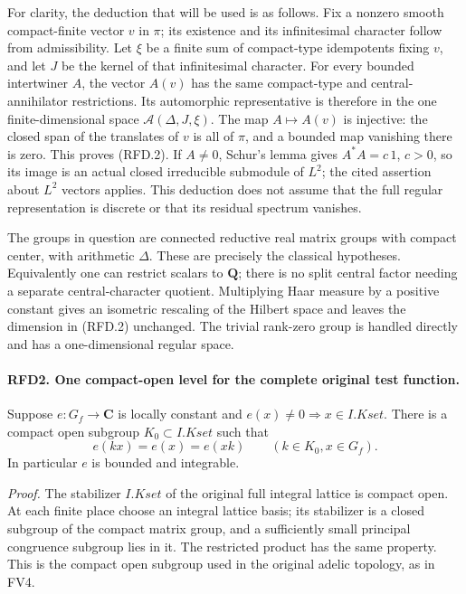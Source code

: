 For clarity, the deduction that will be used is as follows.  Fix a
nonzero smooth compact-finite vector \(v\) in \(\pi\); its existence
and its infinitesimal character follow from admissibility.  Let
\(\xi\) be a finite sum of compact-type idempotents fixing \(v\),
and let \(J\) be the kernel of that infinitesimal character.
For every bounded intertwiner \(A\), the vector \(A(v)\) has the
same compact-type and central-annihilator restrictions.  Its
automorphic representative is therefore in the one finite-dimensional
space \(\mathcal A(\Delta,J,\xi)\).  The map \(A\mapsto A(v)\)
is injective: the closed span of the translates of \(v\) is all of
\(\pi\), and a bounded map vanishing there is zero.  This proves
(RFD.2).  If \(A\ne0\), Schur's lemma gives \(A^*A=c\,1\),
\(c>0\), so its image is an actual closed irreducible submodule of
\(L^2\); the cited assertion about \(L^2\) vectors applies.
This deduction does not assume that the full regular representation
is discrete or that its residual spectrum vanishes.

The groups in question are connected reductive real matrix groups
with compact center, with arithmetic \(\Delta\).  These are precisely
the classical hypotheses.  Equivalently one can restrict scalars to
\(\mathbf Q\); there is no split central factor needing a separate
central-character quotient.  Multiplying Haar measure by a positive
constant gives an isometric rescaling of the Hilbert space and leaves
the dimension in (RFD.2) unchanged.  The trivial rank-zero group is
handled directly and has a one-dimensional regular space.

\paragraph{RFD2. One compact-open level for the complete original test function.}
\label{claim:RFD2}
Suppose \(e:G_f\to\mathbf C\) is locally constant and
\(e(x)\ne0\Rightarrow x\in I.Kset\).  There is a compact open
subgroup \(K_0\subset I.Kset\) such that
\[
             e(kx)=e(x)=e(xk)\qquad(k\in K_0, x\in G_f).
 \tag{RFD.3}
\]
In particular \(e\) is bounded and integrable.

\emph{Proof.}
The stabilizer \(I.Kset\) of the original full integral lattice is
compact open.  At each finite place choose an integral lattice basis;
its stabilizer is a closed subgroup of the compact matrix group,
and a sufficiently small principal congruence subgroup lies in it.
The restricted product has the same property.  This is the compact
open subgroup used in the original adelic topology, as in FV4.

